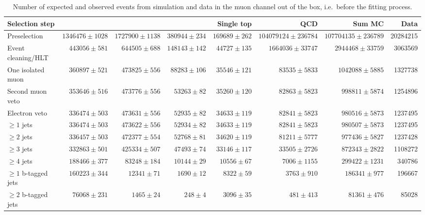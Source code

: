 \begin{table}
  \centering
   \caption[Number of expected and observed events from simulation and data in the muon channel]{Number of expected and
   observed events from simulation and data in the muon channel out of the box, i.e.\ before the fitting process.}
    \label{tab:event_yields_mujets}
    \resizebox{\columnwidth}{!} {
    \begin{tabular}{lrrrrrrr}
    \toprule
	\textbf{Selection step} & \textbf{\ttjets} & \textbf{\WpJets} & \textbf{\ZpJets} & \textbf{Single top} & \textbf{QCD} & \textbf{Sum MC} & \textbf{Data} \\
	\midrule
	Preselection  &  $1346476 \pm 1028$ &  $1727900 \pm 1138$ &  $380944 \pm 234$ &  $169689 \pm 262$ &  $104079124 \pm 236784$ &  $107704135 \pm 236789$ &  20284215 \\ 
	Event cleaning/HLT  &  $443056 \pm 581$ &  $644505 \pm 688$ &  $148143 \pm 142$ &  $44727 \pm 135$ &  $1664036 \pm 33747$ &  $2944468 \pm 33759$ &  3063569 \\ 
	One isolated muon  &  $360897 \pm 521$ &  $473825 \pm 556$ &  $88283 \pm 106$ &  $35546 \pm 121$ &  $83535 \pm 5833$ &  $1042088 \pm 5885$ &  1327738 \\ 
	Second muon veto  &  $353646 \pm 516$ &  $473776 \pm 556$ &  $53263 \pm 82$ &  $35260 \pm 120$ &  $82863 \pm 5823$ &  $998811 \pm 5874$ &  1254896 \\ 
	Electron veto  &  $336474 \pm 503$ &  $473631 \pm 556$ &  $52935 \pm 82$ &  $34633 \pm 119$ &  $82841 \pm 5823$ &  $980516 \pm 5873$ &  1237495 \\ 
	$\geq 1$ jets  &  $336474 \pm 503$ &  $473622 \pm 556$ &  $52934 \pm 82$ &  $34633 \pm 119$ &  $82841 \pm 5823$ &  $980507 \pm 5873$ &  1237495 \\ 
	$\geq 2$ jets  &  $336457 \pm 503$ &  $472377 \pm 554$ &  $52768 \pm 81$ &  $34620 \pm 119$ &  $81211 \pm 5777$ &  $977436 \pm 5827$ &  1237428 \\ 
	$\geq 3$ jets  &  $332863 \pm 501$ &  $425334 \pm 507$ &  $47493 \pm 74$ &  $33146 \pm 117$ &  $33505 \pm 2726$ &  $872343 \pm 2822$ &  1108272 \\ 
	$\geq 4$ jets  &  $188466 \pm 377$ &  $83248 \pm 184$ &  $10144 \pm 29$ &  $10556 \pm 67$ &  $7006 \pm 1155$ &  $299422 \pm 1231$ &  340786 \\ 
	$\geq 1$ b-tagged jets  &  $160223 \pm 344$ &  $12341 \pm 71$ &  $1690 \pm 12$ &  $8322 \pm 59$ &  $3763 \pm 910$ &  $186341 \pm 977$ &  196667 \\ 
	$\geq 2$ b-tagged jets  &  $76068 \pm 231$ &  $1465 \pm 24$ &  $248 \pm 4$ &  $3096 \pm 35$ &  $481 \pm 413$ &  $81361 \pm 476$ &  85028 \\ 
	\bottomrule
	\end{tabular}
	}
\end{table}

